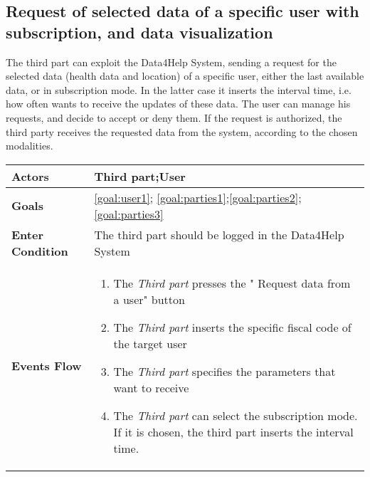  \subsection{Request of selected data of a specific user with subscription, and data visualization}
 
The third part can exploit the Data4Help System, sending a request for the selected data (health data and location) of a specific user, either the last available data, or in subscription mode.  
 In the latter case  it inserts the interval time, i.e. how often wants to receive the updates of these data.
The user can manage his requests, and decide to accept or deny them. If the request is authorized, the third party receives the requested data from the system, according to the chosen modalities.

\begin{table}[H]
	\centering
    
    \begin{tabular}{|p{3.5cm}|p{10.3cm}|}
    
    \hline
    \textbf{\large{Actors}}  			& \tabitem Third part;\tabitem  User  									\\
    				 			
    \hline
    \textbf{\large{Goals}} 				&\ref{goal:user1}; \ref{goal:parties1};\ref{goal:parties2};\ref{goal:parties3}\\
    
    \hline
    \textbf{\large{Enter Condition}} & The third part should be logged in the Data4Help System	\\
    
    \hline
    \textbf{\large{Events Flow}}		& \begin{enumerate}[leftmargin=0.5cm]
                                          	\item The \emph{Third part}  presses the " Request data  from a user" button
                                            \item The \emph{Third part} inserts the specific fiscal code of the target user
                                            \item The \emph{Third part} specifies the parameters that want to receive
                                            
                                            \item The \emph{Third part} can select the subscription mode. If 
                            it is chosen, the third part inserts the interval time. 
                            

\end{enumerate}
\end{tabular}
\end{table}
